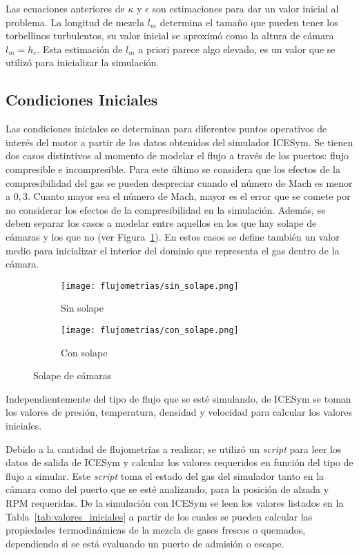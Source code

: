Las ecuaciones anteriores de  $\kappa$ y $\epsilon$ son estimaciones para dar un
valor inicial al problema.
%
La longitud de mezcla $l_m$ determina el tamaño que pueden tener los torbellinos
turbulentos, su valor inicial se aproximó como la altura de cámara $l_m = h_c$.
%
Esta estimación de $l_{m}$ a priori parece algo elevado, es un valor que se
utilizó para inicializar la simulación.


\subsection{Condiciones Iniciales}\label{cap2:cond_iniciales}
%
Las condiciones iniciales se determinan para diferentes puntos operativos de
interés del motor a partir de los datos obtenidos del simulador ICESym.
%
Se tienen dos casos distintivos al momento de modelar el flujo a través de los
puertos: flujo compresible e incompresible.
%
Para este último se considera que los efectos de la compresibilidad del gas se
pueden despreciar cuando el número de Mach es menor a $0,3$.
%
Cuanto mayor sea el número de Mach, mayor es el error que se comete por no
considerar los efectos de la compresibilidad en la simulación.
%
Además, se deben separar los casos a modelar entre aquellos en los que hay
solape de cámaras y los que no (ver Figura~\ref{fig:solape}).
%
En estos casos se define también un valor medio para inicializar el interior
del dominio que representa el gas dentro de la cámara.

\begin{figure}[t!]
  \centering
    \begin{subfigure}[t]{0.4\textwidth}
        \centering
        \texttt{[image: flujometrias/sin\_solape.png]}
        \caption{Sin solape}
    \end{subfigure}%
    \begin{subfigure}[t]{0.4\textwidth}
        \centering
        \texttt{[image: flujometrias/con\_solape.png]}
        \caption{Con solape}
    \end{subfigure}
  \caption{Solape de cámaras}\label{fig:solape}
\end{figure}

Independientemente del tipo de flujo que se esté simulando, de ICESym se toman
los valores de presión, temperatura, densidad y velocidad para calcular los
valores iniciales.

Debido a la cantidad de flujometrías a realizar, se utilizó un \emph{script}
para leer los datos de salida de ICESym y calcular los valores requeridos en
función del tipo de flujo a simular.
%
Este \emph{script} toma el estado del gas del simulador tanto en la cámara como
del puerto que se esté analizando, para la posición de alzada y RPM requeridas.
%
De la simulación con ICESym se leen los valores listados en la
Tabla~\ref{tab:valores_iniciales} a partir de los cuales se pueden calcular las
propiedades termodinámicas de la mezcla de gases frescos o quemados,
dependiendo si se está evaluando un puerto de admisión o escape.


